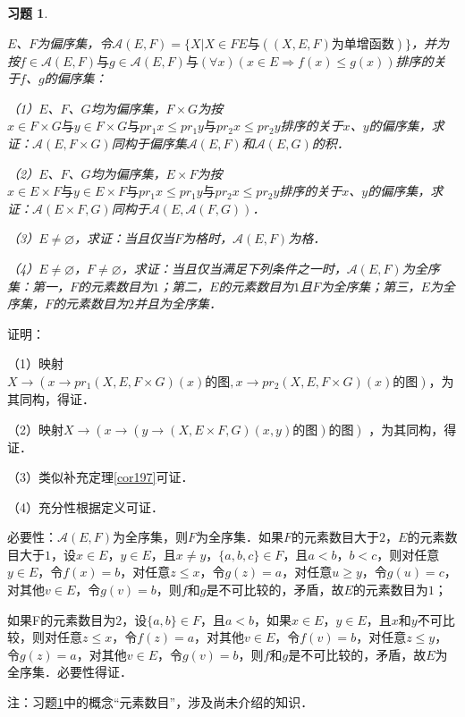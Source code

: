 \documentclass[12pt, a4paper, oneside]{book}
\newtheorem{exer}{习题}
\begin{document}
			\begin{exer}\label{exer82}
				\hfill\par
				$E$、$F$为偏序集，令$\mathcal{A}(E, F)=\{X|X\in FE\text{与}((X, E, F)\text{为单增函数})\}$，并为按$f\in \mathcal{A}(E, F)\text{与}g\in \mathcal{A}(E, F)\text{与}(\forall x)(x\in E\Rightarrow f(x)\leq g(x))$排序的关于$f$、$g$的偏序集：
				\par
				（1）$E$、$F$、$G$均为偏序集，$F\times G$为按$x\in F\times G\text{与}y\in F\times G\text{与}pr_1x\leq pr_1y\text{与}pr_2x\leq pr_2y$排序的关于$x$、$y$的偏序集，求证：$\mathcal{A}(E, F\times G)$同构于偏序集$\mathcal{A}(E, F)$和$\mathcal{A}(E, G)$的积．
				\par
				（2）$E$、$F$、$G$均为偏序集，$E\times F$为按$x\in E\times F\text{与}y\in E\times F\text{与}pr_1x\leq pr_1y\text{与}pr_2x\leq pr_2y$排序的关于$x$、$y$的偏序集，求证：$\mathcal{A}(E\times F, G)$同构于$\mathcal{A}(E, \mathcal{A}(F, G))$．
				\par
				（3）$E\neq \varnothing$，求证：当且仅当$F$为格时，$\mathcal{A}(E, F)$为格．
				\par
				（4）$E\neq \varnothing$，$F\neq \varnothing$，求证：当且仅当满足下列条件之一时，$\mathcal{A}(E, F)$为全序集：第一，$F$的元素数目为$1$；第二，$E$的元素数目为$1$且$F$为全序集；第三，$E$为全序集，$F$的元素数目为$2$并且为全序集．
			\end{exer}
			证明：
			\par
			（1）映射$X\to (x\to pr_1(X, E, F\times G)(x)\text{的图}, x\to pr_2(X, E, F\times G)(x)\text{的图})$，为其同构，得证．
			\par
			（2）映射$X\to (x\to (y\to (X, E\times F, G)(x, y)\text{的图})\text{的图})$ ，为其同构，得证．
			\par
			（3）类似补充定理\ref{cor197}可证．
			\par
			（4）充分性根据定义可证．
			\par
			必要性：$\mathcal{A}(E, F)$为全序集，则$F$为全序集．如果$F$的元素数目大于$2$，$E$的元素数目大于$1$，设$x\in E$，$y\in E$，且$x\neq y$，$\{a, b, c\}\in F$，且$a<b$，$b<c$，则对任意$y\in E$，令$f(x)=b$，对任意$z\leq x$，令$g(z)=a$，对任意$u\geq y$，令$g(u)=c$，对其他$v\in E$，令$g(v)=b$，则$f$和$g$是不可比较的，矛盾，故$E$的元素数目为$1$；
			\par
			如果F的元素数目为$2$，设$\{a, b\}\in F$，且$a<b$，如果$x\in E$，$y\in E$，且$x$和$y$不可比较，则对任意$z\leq x$，令$f(z)=a$，对其他$v\in E$，令$f(v)=b$，对任意$z\leq y$，令$g(z)=a$，对其他$v\in E$，令$g(v)=b$，则$f$和$g$是不可比较的，矛盾，故$E$为全序集．必要性得证．
			\par
			注：习题\ref{exer82}中的概念“元素数目”，涉及尚未介绍的知识．	
			
\end{document}
